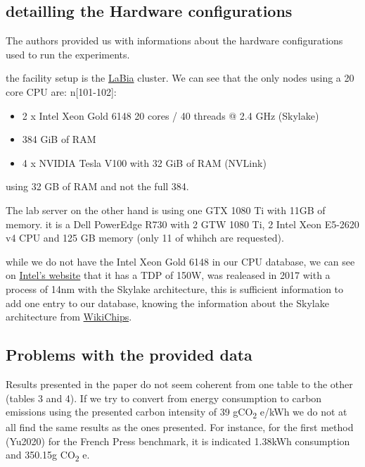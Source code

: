 \documentclass[11pt]{article}
\begin{document}
\subsection{detailling the Hardware configurations}
\label{sec:orgc354925}
The authors provided us with informations about the hardware
configurations used to run  the experiments. 

the facility setup is the \href{https://doc.lab-ia.fr/}{LaBia} cluster. We can see that the only nodes using a
20 core CPU are: n[101-102]:

\begin{itemize}
\item 2 x Intel Xeon Gold 6148 20 cores / 40 threads @ 2.4 GHz (Skylake)
\item 384 GiB of RAM
\item 4 x NVIDIA Tesla V100 with 32 GiB of RAM (NVLink)
\end{itemize}

using 32 GB of RAM and not the full 384.

The lab server on the other hand is using one GTX 1080 Ti with 11GB of memory.
it is a Dell PowerEdge R730 with 2 GTW 1080 Ti, 2 Intel Xeon E5-2620
v4 CPU and 125 GB memory (only 11 of whihch are requested).

while we do not have the Intel Xeon Gold 6148 in our CPU database, we
can see on \href{https://www.intel.fr/content/www/fr/fr/products/sku/120489/intel-xeon-gold-6148-processor-27-5m-cache-2-40-ghz/specifications.html}{Intel's website} that it has a TDP of 150W, was realeased in
2017 with a process of 14nm with the Skylake architecture, this is
sufficient information to add one entry to our database, knowing the
information about the Skylake architecture from \href{https://en.wikichip.org/wiki/intel/microarchitectures/skylake\_(server)}{WikiChips}. 

\subsection{Problems with the provided data}
\label{sec:orgaf95401}

Results presented in the paper do not seem coherent from one table to
the other (tables 3 and 4). If we try to convert from energy consumption to carbon
emissions using the presented carbon intensity of 39 gCO\textsubscript{2} e/kWh we do
not at all find the same results as the ones presented.
For instance, for the first method (Yu2020) for the French Press
benchmark, it is indicated 1.38kWh consumption and 350.15g CO\textsubscript{2} e.
\end{document}
